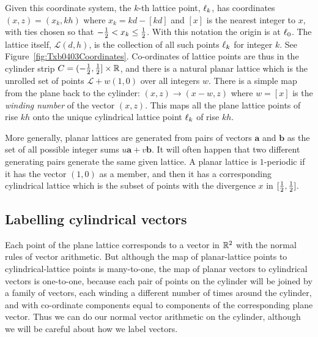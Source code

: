
\newcommand{\dk}{x_k}\newcommand{\dm}{x_m}\newcommand{\dn}{x_n}\newcommand{\dmn}{x_{m+n}}
Given this coordinate system, the $k$-th lattice point,  $\ell_{{k}}$, has coordinates  $(x,z)=(\dk,kh)$ where $\dk=kd-[kd]$ and $[x]$ is the nearest integer to $x$, with ties chosen so that $-\jhalf < \dk \leq \jhalf$. With this notation the origin is at $\ell_{{0}}$. The lattice itself,   $\mathcal{L}(d,h)$, is the collection of all such points $\ell_{{k}}$ for integer $k$. See Figure~\ref{fig:Txb0403Coordinates}. 
Co-ordinates of lattice points are thus in the cylinder strip $C=(-\textstyle{\frac{1}{2}},\textstyle{\frac{1}{2}}]\times\mathbb{R}$, and there is a natural 
{planar lattice}  which is the unrolled set of points $\mathcal{L}+w (1,0)$ over all integers $w$. 
There is a simple map from the plane back to the cylinder: $(x,z)\rightarrow(x-w,z)$ where $w=[x]$ is the \emph{winding number} of the vector $(x,z)$. This maps all the plane lattice points of rise $kh$ onto the unique cylindrical lattice point $\ell_{{k}}$ of rise $kh$. 

More generally, planar lattices are generated from pairs of vectors $\mathbf{a}$ and $\mathbf{b}$ as the set of all possible integer sums  $u \mathbf{a}+ v\mathbf{b}$. It will often happen that two different generating pairs generate the same given lattice. A planar lattice is $1$-periodic if it has the vector $(1,0)$ as a member, and then it has a corresponding cylindrical lattice which is the subset of points with the divergence $x$ in $[\textstyle{\frac{1}{2}},\textstyle{\frac{1}{2}}]$.  

\subsection{Labelling cylindrical vectors}
Each point of the plane lattice corresponds to a 
vector in $\mathbb{R}^2$ with the normal rules of vector arithmetic. But although the map of planar-lattice points to cylindrical-lattice points is many-to-one, the map of planar vectors to cylindrical vectors is one-to-one, because each pair of points on the cylinder will be joined by a family of vectors, each winding a different number of times around the cylinder, and with co-ordinate components equal to components of the corresponding plane vector.   Thus we can do our normal vector arithmetic on the cylinder, although we will  be careful about how we label vectors. 

